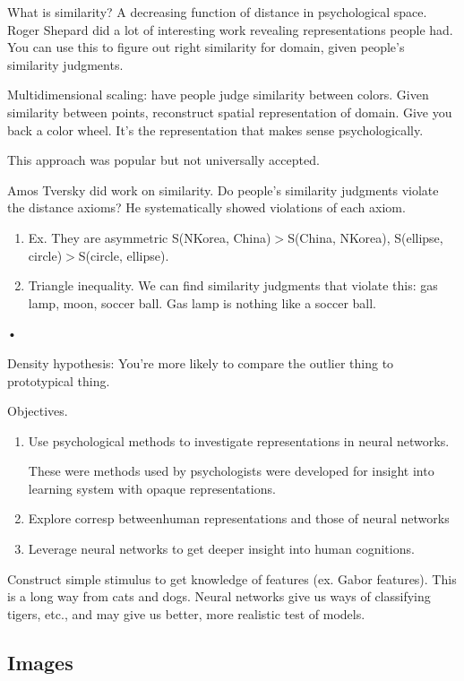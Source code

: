 What is similarity? A decreasing function of distance in psychological space. 
Roger Shepard did a lot of interesting work revealing representations people had. You can use this to figure out right similarity for domain, given people's similarity judgments.

Multidimensional scaling: have people judge similarity between colors. Given similarity between points, reconstruct spatial representation of domain. Give you back a color wheel. %
It's the representation that makes sense psychologically.

This approach was popular but not universally accepted. 

Amos Tversky %
did work on similarity. Do people's similarity judgments violate the distance axioms? He systematically showed violations of each axiom.
\begin{enumerate}
\item
Ex. They are asymmetric
S(NKorea, China)$>$S(China, NKorea), S(ellipse, circle)$>$S(circle, ellipse). 
\item
Triangle inequality. We can find similarity judgments that violate this: gas lamp, moon, soccer ball. Gas lamp is nothing like a soccer ball.
\end{enumerate}•

Density hypothesis: You're more likely to compare the outlier thing to prototypical thing. 

Objectives. 
\begin{enumerate}
\item
Use psychological methods to investigate representations in neural networks.

These were methods used by psychologists were developed for insight into learning system with opaque representations. %
\item
Explore corresp betweenhuman representations and those of neural networks
\item
Leverage neural networks to get deeper insight into human cognitions.
\end{enumerate}

Construct simple stimulus to get knowledge of features (ex. Gabor features). This is a long way from cats and dogs. %
Neural networks give us ways of classifying tigers, etc., and may give us better, more realistic test of models.

\subsection{Images}

